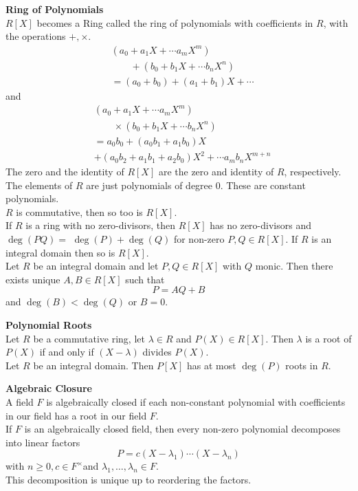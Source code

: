\documentclass[a4paper, 10pt]{article}
\begin{document}
\begin{multicols*}{3}
\textbf{Ring of Polynomials}\\
$R[X]$ becomes a Ring called the ring of polynomials with coefficients in $R$, with the operations $+, \times$.
\begin{align*}
&\left(a_0+a_1 X+\cdots a_m X^m\right)\\
&\qquad +\left(b_0+b_1 X+\cdots b_n X^n\right)\\
&=\left(a_0+b_0\right)+\left(a_1+b_1\right) X +\cdots
\end{align*}
and
\begin{align*}
&\left(a_0+a_1 X+\cdots a_m X^m\right)\\
&\qquad\times\left(b_0+b_1 X+\cdots b_n X^n\right) \\
& =a_0 b_0+\left(a_0 b_1+a_1 b_0\right) X\\
&+\left(a_0 b_2+a_1 b_1+a_2 b_0\right) X^2+\cdots a_m b_n X^{m+n}
\end{align*}
The zero and the identity of $R[X]$ are the zero and identity of $R$, respectively.\\
The elements of $R$ are just polynomials of degree 0. These are constant polynomials. \\
$R$ is commutative, then so too is $R[X]$.\\
If $R$ is a ring with no zero-divisors, then $R[X]$ has no zero-divisors and $\operatorname{deg}(P Q)=$ $\operatorname{deg}(P)+\operatorname{deg}(Q)$ for non-zero $P, Q \in R[X]$.
If $R$ is an integral domain then so is $R[X]$.\\
Let $R$ be an integral domain and let $P, Q \in R[X]$ with $Q$ monic. 
Then there exists unique $A, B \in R[X]$ such that $$P=A Q+B$$ and $\operatorname{deg}(B)<\operatorname{deg}(Q)$ or $B=0$.

\textbf{Polynomial Roots}\\
Let $R$ be a commutative ring, let $\lambda \in R$ and $P(X) \in R[X]$. Then $\lambda$ is a root of $P(X)$ if and only if $(X-\lambda)$ divides $P(X)$.\\
Let $R$ be an integral domain. Then $P[X]$ has at most $\operatorname{deg}(P)$ roots in $R$.

\textbf{Algebraic Closure}\\
A field $F$ is algebraically closed if each non-constant polynomial with coefficients in our field has a root in our field $F$.\\
If $F$ is an algebraically closed field, then every non-zero polynomial decomposes into linear factors
$$
P=c\left(X-\lambda_1\right) \cdots\left(X-\lambda_n\right)
$$
with $n \geqslant 0, c \in F^{\times}$and $\lambda_1, \ldots, \lambda_n \in F$.\\
This decomposition is unique up to reordering the factors.


\end{multicols*}
\end{document}
